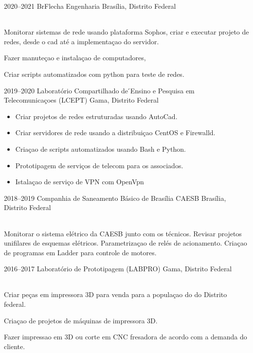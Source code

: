 \documentclass[]{cv-style}          %
\begin{document}
\begin{entrylist}
\entry
  {2020--2021}
  {BrFlecha Engenharia}
  {Brasília, Distrito Federal}
  {\\
  Monitorar sistemas de rede usando plataforma Sophos, criar
  e executar projeto de redes, desde o cad até a implementaçao
  do servidor.
  
  Fazer manuteçao e instalaçao de computadores,
  
  Criar scripts automatizados com python para teste de redes.
  
  }
\entry
  {2019--2020}
  {Laboratório Compartilhado de ́Ensino e Pesquisa em Telecomunicaçoes (LCEPT)  }
  {Gama, Distrito Federal}
  {
  \begin{itemize}
    \item Criar projetos de redes estruturadas usando AutoCad. 
    \item Criar servidores de rede usando a distribuiçao CentOS e Firewalld.
    \item Criaçao de scripts automatizados usando Bash e Python.
    \item Prototipagem de serviços de telecom para os associados.
    \item Istalaçao de serviço de VPN com OpenVpn
 \end{itemize}}
 
 \entry
  {2018--2019}
  {Companhia de Saneamento Básico de Brasília CAESB}
  {Brasília, Distrito Federal}
  {\\
  Monitorar o sistema elétrico da CAESB junto com os técnicos.
  Revisar projetos unifilares de esquemas elétricos.
  Parametrizaçao de relés de acionamento.
  Criaçao de programas em Ladder para controle de motores.
  
  }
  
  \entry
  {2016--2017}
  {Laboratório de Prototipagem (LABPRO)}
  {Gama, Distrito Federal}
  {\\
  Criar peças em impressora 3D para venda para a populaçao do do Distrito federal.
  
  Criaçao de projetos de máquinas de impressora 3D.
  
  Fazer impressao em 3D ou corte em CNC fresadora de acordo com a demanda do cliente.  
  
}
\end{entrylist}
\end{document}
